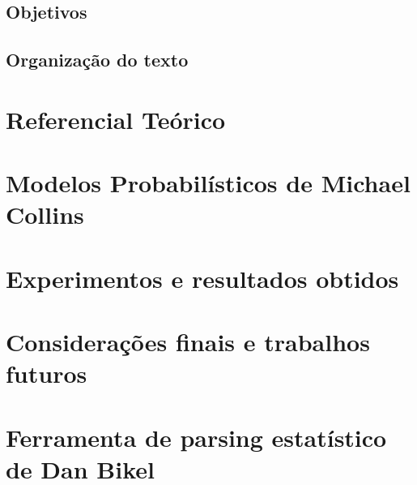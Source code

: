 \documentclass[a4paper]{abnt}
\begin{document}
\section{Objetivos}
\label{sec:objetivos}
	

\newpage

\section{Organização do texto}
\label{sec:organizacao}
	

\chapter{Referencial Teórico}
\label{cha:referencial_teorico}
	

\chapter{Modelos Probabilísticos de Michael Collins}
\label{cha:michael_collins}
	

\chapter{Experimentos e resultados obtidos}
\label{cha:resultados_obtidos}
	

\chapter{Considerações finais e trabalhos futuros}
\label{cha:consideracoes_finais}
	

%	

\appendix

\chapter{Ferramenta de parsing estatístico de Dan Bikel}
\label{cha:dan_bikel1}
	
\end{document}
